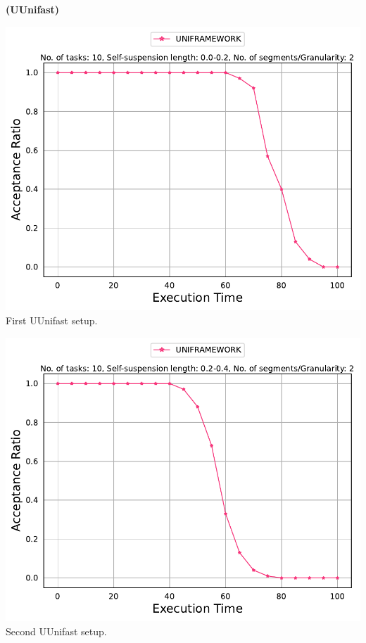 \documentclass[]{article}
\begin{document}
	\begin{minipage}[t]{0.48\linewidth}
		\centering
		\textbf{(UUnifast)}
		\vspace{0.3cm}
		
		\includegraphics[width=\linewidth]{UNIFRAMEWORK[2][0.0-0.2][10].pdf}
		First UUnifast setup.
		\vspace{0.3cm}
		
		\includegraphics[width=\linewidth]{UNIFRAMEWORK[2][0.2-0.4][10].pdf}
		Second UUnifast setup.
		\vspace{0.3cm}
		

\end{minipage}
\end{document}
